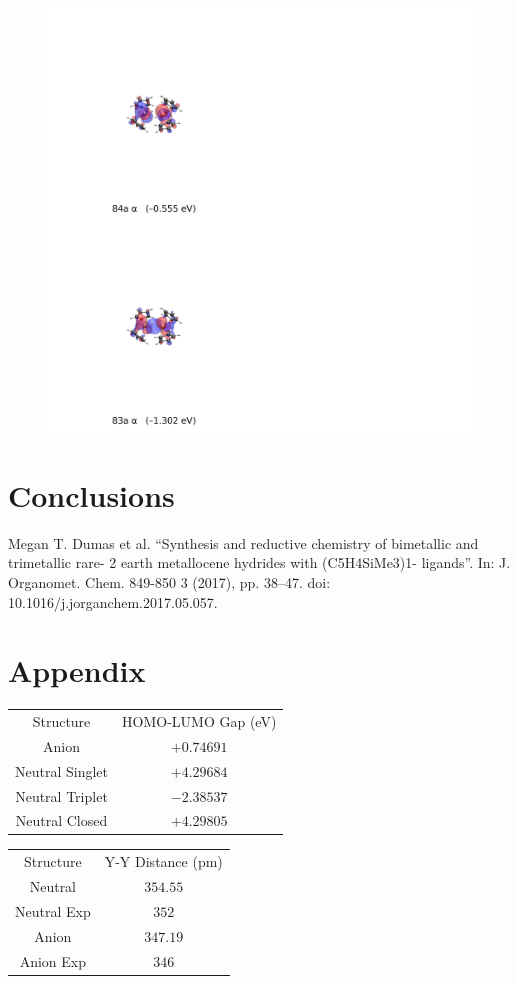 \documentclass{article}
\begin{document}
\begin{figure}[h]
	\centering
	\includegraphics[width=\textwidth]{../images/lanthanide/merged.jpg}
\end{figure}


\section{Conclusions} %

\begin{thebibliography}{80}
	 Megan T. Dumas et al. “Synthesis and reductive
		chemistry of bimetallic and trimetallic rare- 2 earth
		metallocene hydrides with (C5H4SiMe3)1- ligands”. In: J.
		Organomet. Chem. 849-850 3 (2017), pp.  38–47. doi:
		10.1016/j.jorganchem.2017.05.057.
\end{thebibliography}

\section*{Appendix}
\begin{tabular}{cc}
	Structure & HOMO-LUMO Gap (eV) \\
	Anion & $+0.74691$ \\
	Neutral Singlet & $+4.29684$ \\
	Neutral Triplet & $-2.38537$ \\
	Neutral Closed & $+4.29805$
\end{tabular}

\begin{tabular}{cc}
	Structure & Y-Y Distance (pm) \\
	Neutral & $354.55$ \\
	Neutral Exp & $352$ \\
	Anion & $347.19$ \\
	Anion Exp & $346$
\end{tabular}
\end{document}
